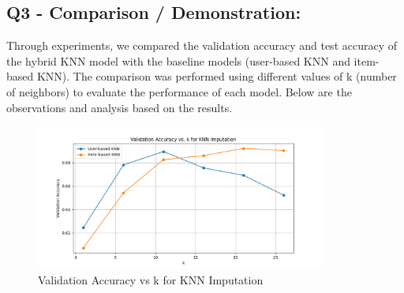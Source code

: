 \documentclass{article}
\begin{document}
\subsection*{Q3 - Comparison / Demonstration:}
Through experiments, we compared the validation accuracy and test accuracy of the hybrid KNN model with the baseline models (user-based KNN and item-based KNN). The comparison was performed using different values of k (number of neighbors) to evaluate the performance of each model. Below are the observations and analysis based on the results.
\begin{figure}[H]
    \centering
    \includegraphics[width=0.85\textwidth]{bl3.png}
    \caption{Validation Accuracy vs k for KNN Imputation}
\end{figure}
\end{document}
